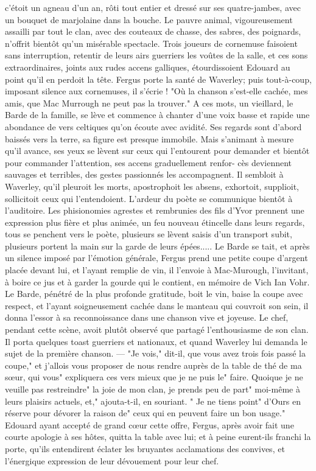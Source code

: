 c'étoit un agneau d'un an, rôti tout entier et dressé sur ses quatre-jambes, avec un bouquet de marjolaine dans la bouche. Le pauvre animal, vigoureusement assailli par tout le clan, avec des couteaux de chasse, des sabres, des poignards, n'offrit bientôt qu'un misérable spectacle. Trois joueurs de cornemuse faisoient sans interruption, retentir de leurs airs guerriers les voûtes de la salle, et ces sons extraordinaires, joints aux rudes accens galliques, étourdissoient Edouard au point qu'il en perdoit la tête.
Fergus porte la santé de Waverley; puis tout-à-coup, imposant silence aux cornemuses, il s'écrie ! "Où la chanson s'est-elle cachée, mes amis, que Mac Murrough ne peut pas la trouver." A ces mots, un vieillard, le Barde de la famille, se lève et commence à chanter d'une voix basse et rapide une abondance de vers celtiques qu'on écoute avec avidité. Ses regards sont d'abord baissés vers la terre, sa figure est presque immobile. Mais s'animant à mesure qu'il avance, ses yeux se lèvent sur ceux qui l'entourent pour demander et bientôt pour commander l'attention, ses accens graduellement renfor-\setcounter{page}{123} cès deviennent sauvages et terribles, des gestes passionnés les accompagnent. Il sembloit à Waverley, qu'il pleuroit les morts, apostrophoit les absens, exhortoit, supplioit, sollicitoit ceux qui l'entendoient. L'ardeur du poète se communique bientôt à l'auditoire. Les phisionomies agrestes et rembrunies des fils d'Yvor prennent une expression plus fière et plus animée, un feu nouveau étincelle dans leurs regards, tous se penchent vers le poète, plusieurs se lèvent saisis d'un transport subit, plusieurs portent la main sur la garde de leurs épées.....
Le Barde se tait, et après un silence imposé par l'émotion générale, Fergus prend une petite coupe d'argent placée devant lui, et l'ayant remplie de vin, il l'envoie à Mac-Murough, l'invitant, à boire ce jus et à garder la gourde qui le contient, en mémoire de Vich Ian Vohr. Le Barde, pénétré de la plus profonde gratitude, boit le vin, baise la coupe avec respect, et l'ayant soigneusement cachée dans le manteau qui couvroit son sein, il donna l'essor à sa reconnoissance dans une chanson vive et joyeuse.
Le chef, pendant cette scène, avoit plutôt observé que partagé l'enthousiasme de son clan. Il porta quelques toast guerriers et\setcounter{page}{124} nationaux, et quand Waverley lui demanda le sujet de la première chanson. — "Je vois," dit-il, que vous avez trois fois passé la coupe," et j’allois vous proposer de nous rendre auprès de la table de thé de ma sœur, qui vous" expliquera ces vers mieux que je ne puis le" faire. Quoique je ne veuille pas restreindre" la joie de mon clan, je prends peu de part" moi-même à leurs plaisirs actuels, et," ajouta-t-il, en souriant. " Je ne tiens point" d’Ours en réserve pour dévorer la raison de" ceux qui en peuvent faire un bon usage." Edouard ayant accepté de grand cœur cette offre, Fergus, après avoir fait une courte apologie à ses hôtes, quitta la table avec lui; et à peine eurent-ils franchi la porte, qu’ils entendirent éclater les bruyantes acclamations des convives, et l’énergique expression de leur dévouement pour leur chef.
